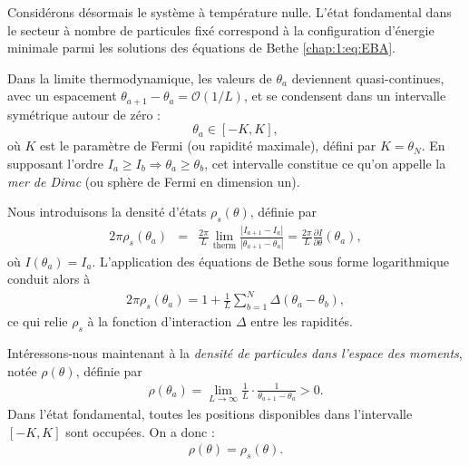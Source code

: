Considérons désormais le système à température nulle. L’état fondamental dans le secteur à nombre de particules fixé correspond à la configuration d’énergie minimale parmi les solutions des équations de Bethe \eqref{chap:1:eq:EBA}.

Dans la limite thermodynamique, les valeurs de \( \theta_a \) deviennent quasi-continues, avec un espacement \( \theta_{a+1} - \theta_a = \mathcal{O}(1/L) \), et se condensent dans un intervalle symétrique autour de zéro :
\[
\theta_a \in [-K, K],
\]
où \( K \) est le paramètre de Fermi (ou rapidité maximale), défini par \( K = \theta_N \). En supposant l'ordre \( I_a \geq I_b \Rightarrow \theta_a \geq \theta_b \), cet intervalle constitue ce qu'on appelle la {\em mer de Dirac} (ou sphère de Fermi en dimension un).

Nous introduisons la densité d’états \( \rho_s(\theta) \), définie par
\begin{eqnarray*}
	2\pi \rho_s(\theta_a) &=& \frac{2\pi}{L} \lim_{\text{therm}} \frac{|I_{a+1} - I_a|}{|\theta_{a+1} - \theta_a|} = \frac{2\pi}{L} \frac{\partial I}{\partial \theta}(\theta_a),
\end{eqnarray*}
où \( I(\theta_a) = I_a \). L’application des équations de Bethe sous forme logarithmique conduit alors à
\begin{eqnarray*}
	2\pi \rho_s(\theta_a) = 1 + \frac{1}{L} \sum_{b = 1}^N \Delta(\theta_a - \theta_b),
\end{eqnarray*}
ce qui relie \( \rho_s \) à la fonction d’interaction \( \Delta \) entre les rapidités.

Intéressons-nous maintenant à la {\em densité de particules dans l’espace des moments}, notée \( \rho(\theta) \), définie par
\begin{eqnarray*}
	\rho(\theta_a) = \lim_{L \to \infty} \frac{1}{L} \cdot \frac{1}{\theta_{a+1} - \theta_a} > 0.
\end{eqnarray*}
Dans l’état fondamental, toutes les positions disponibles dans l’intervalle \( [-K, K] \) sont occupées. On a donc :
\begin{eqnarray}\label{chap.1.rho.2}
	\rho(\theta) = \rho_s(\theta).
\end{eqnarray}

